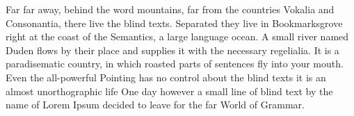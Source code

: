 Far far away, behind the word mountains, far from the countries Vokalia and
Consonantia, there live the blind texts. Separated they live in
Bookmarksgrove right at the coast of the Semantics, a large language
ocean. A small river named Duden flows by their place and supplies it with
the necessary regelialia. It is a paradisematic country, in which roasted
parts of sentences fly into your mouth. Even the all-powerful Pointing has
no control about the blind texts it is an almost unorthographic life One
day however a small line of blind text by the name of Lorem Ipsum decided
to leave for the far World of Grammar.
